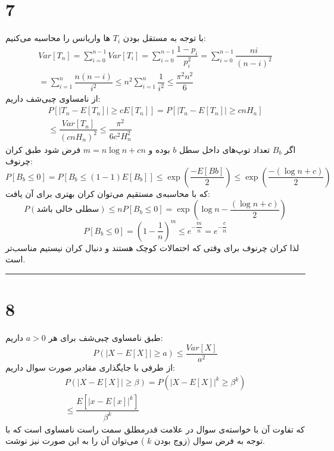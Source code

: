 \documentclass{article}
\begin{document}
\section*{7}
با توجه به مستقل بودن
$T_i$
ها واریانس را محاسبه می‌کنیم:
$$\begin{aligned}Var\left[ T_{n}\right] =\sum ^{n-1}_{i=0}Var\left[ T_{i}\right] =\sum ^{n-1}_{i=0}\dfrac{1-p_{i}}{p_{i}^{2}}=\sum ^{n-1}_{i=0}\dfrac{ni}{\left( n-i\right) ^{2}}\\ =\sum ^{n}_{i=1}\dfrac{n\left( n-i\right) }{i^{2}}\leq n^{2}\sum ^{n}_{i=1}\dfrac{1}{i^{2}}\leq \dfrac{\pi ^{2}n^{2}}{6}\end{aligned}$$
از نامساوی چبی‌شف داریم:
$$\begin{aligned}P\left[ \left| T_{n}-E\left[ T_{n}\right] \right| \geq cE\left[ T_{n}\right] \right] =P\left[ \left| T_{n}-E\left[ T_{n}\right] \right| \geq cnH_{n}\right] \\ \leq \dfrac{Var\left[ T_{n}\right] }{\left( cnH_{n}\right) ^{2}}\leq \dfrac{\pi ^{2}}{6c^{2}H_{n}^{2}}\end{aligned}$$
اگر 
$B_b$
تعداد توپ‌های داخل سطل
$b$
بوده و 
$m=n\log n+cn$
فرض شود طبق کران چرنوف:
$$P\left[ B_{b}\leq 0\right] =P\left[ B_{b}\leq \left( 1-1\right) E\left[ B_{b}\right] \right] \leq \exp \left( \dfrac{-E\left[ Bb\right] }{2}\right) \leq \exp \left( \dfrac{-\left( \log n+c\right) }{2}\right)$$
که با محاسبه‌ی مستقیم می‌توان کران بهتری برای آن یافت:
$$P\left( \text{سطلی خالی باشد}\right) \leq nP\left[ B_{b}\leq 0\right] =\exp \left( \log n-\dfrac{\left( \log n+c\right) }{2}\right)$$
$$P\left[ B_{b}\leq 0\right] =\left( 1-\dfrac{1}{n}\right) ^{m}\leq e^{-\dfrac{m}{n}}=e^{-\dfrac{c}{n}}
$$
لذا کران چرنوف برای وقتی که احتمالات کوچک هستند و دنبال کران
نیستیم مناسب‌تر است.

\rule{\linewidth}{1pt}

\section*{8}
طبق نامساوی چبی‌شف برای هر
$a > 0$
داریم:
$$P( \left| X-E\left[ X\right] \right| \geq a) \leq \dfrac{Var\left[ X\right] }{a^{2}}
$$
از طرفی با جایگذاری مقادیر صورت سوال داریم:
$$\begin{aligned}P\left( \left| X-E\left[ X\right] \right| \geq \beta \right) =P\left( \left| X-E\left[ X\right] \right| ^{k}\geq \beta ^{k}\right) \\ \leq \dfrac{E\left[ \left| x-E\left[ x\right] \right| ^{k}\right] }{\beta ^{k}}\end{aligned}$$
که تفاوت آن با خواسته‌ی سوال در علامت قدرمطلق سمت راست نامساوی است که با توجه به فرض سوال (زوج بودن
$k$
) می‌توان آن را به این صورت نیز نوشت.
\end{document}
